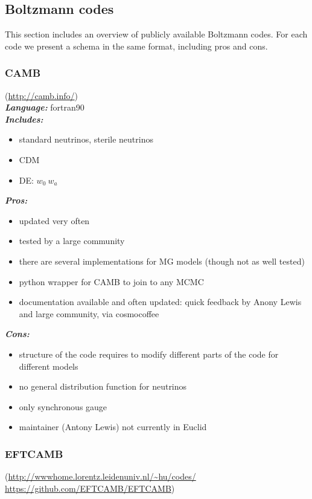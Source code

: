 \newpage
\subsection{Boltzmann codes}
This section includes an overview of publicly available Boltzmann codes. For each code we present a schema in the same format, including pros and cons.



\newpage
\subsubsection{CAMB}
(\url{http://camb.info/})\\

{\it \bf Language:} fortran90\\

{\it \bf Includes:}
\begin{itemize}
 \item standard neutrinos, sterile neutrinos
 \item CDM
 \item DE: $w_0\ w_a$
\end{itemize}

{\it \bf Pros: }
\begin{itemize}
 \item updated very often
 \item tested by a large community
 \item there are several implementations for MG models (though not as well tested)
 \item python wrapper for CAMB to join to any MCMC
 \item documentation available and often updated: quick feedback by Anony Lewis and large community, via cosmocoffee
\end{itemize}

{\it \bf Cons:}
\begin{itemize}
 \item structure of the code requires to modify different parts of the code for different models
 \item no general distribution function for neutrinos
 \item only synchronous gauge
 \item maintainer (Antony Lewis) not currently in Euclid
\end{itemize}

\newpage
\subsubsection{EFTCAMB}
(\url{http://wwwhome.lorentz.leidenuniv.nl/~hu/codes/}\\
\url{https://github.com/EFTCAMB/EFTCAMB})\\


